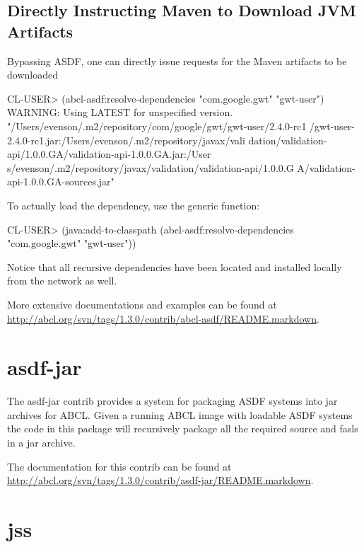 \documentclass[10pt]{book}
\begin{document}
\subsection{Directly Instructing Maven to Download JVM Artifacts}

Bypassing \textsc{ASDF}, one can directly issue requests for the Maven
artifacts to be downloaded

\begin{listing-lisp}
CL-USER> (abcl-asdf:resolve-dependencies "com.google.gwt"
                                         "gwt-user")
WARNING: Using LATEST for unspecified version.
"/Users/evenson/.m2/repository/com/google/gwt/gwt-user/2.4.0-rc1
/gwt-user-2.4.0-rc1.jar:/Users/evenson/.m2/repository/javax/vali
dation/validation-api/1.0.0.GA/validation-api-1.0.0.GA.jar:/User
s/evenson/.m2/repository/javax/validation/validation-api/1.0.0.G
A/validation-api-1.0.0.GA-sources.jar"
\end{listing-lisp}

To actually load the dependency, use the  generic
function:

\begin{listing-lisp}
CL-USER> (java:add-to-classpath
          (abcl-asdf:resolve-dependencies "com.google.gwt"
                                          "gwt-user"))
\end{listing-lisp}

Notice that all recursive dependencies have been located and installed
locally from the network as well.

More extensive documentations and examples can be found at
\url{http://abcl.org/svn/tags/1.3.0/contrib/abcl-asdf/README.markdown}.


\section{asdf-jar}

The asdf-jar contrib provides a system for packaging \textsc{ASDF}
systems into jar archives for \textsc{ABCL}.  Given a running
\textsc{ABCL} image with loadable \textsc{ASDF} systems the code in
this package will recursively package all the required source and
fasls in a jar archive.

The documentation for this contrib can be found at
\url{http://abcl.org/svn/tags/1.3.0/contrib/asdf-jar/README.markdown}.


\section{jss}
\label{section:jss}
\end{document}
